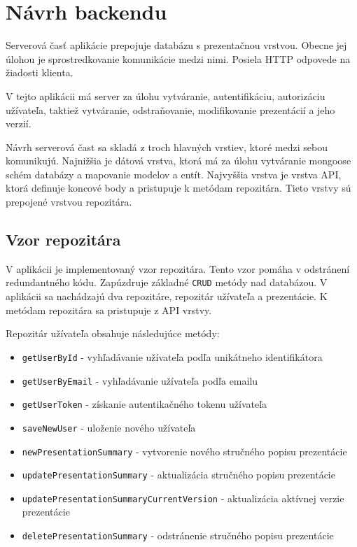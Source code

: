 \section{Návrh backendu}
Serverová časť aplikácie prepojuje databázu s prezentačnou vrstvou. Obecne jej úlohou je sprostredkovanie komunikácie medzi nimi. Posiela HTTP odpovede na žiadosti klienta.

V tejto aplikácii má server za úlohu vytváranie, autentifikáciu, autorizáciu užívateľa, taktiež vytváranie, odstraňovanie, modifikovanie prezentácií a jeho verzií.

Návrh serverová čast sa skladá z troch hlavných vrstiev, ktoré medzi sebou komunikujú. Najnižšia je dátová vrstva, ktorá má za úlohu vytváranie mongoose schém databázy a mapovanie modelov a entít. Najvyššia vrstva je vrstva API, ktorá definuje koncové body a pristupuje k metódam repozitára. Tieto vrstvy sú prepojené vrstvou repozitára.

\subsection*{Vzor repozitára}
\label{repository}
V aplikácii je implementovaný vzor repozitára. Tento vzor pomáha v odstránení redundantného kódu. Zapúzdruje základné \texttt{CRUD} metódy nad databázou. V aplikácii sa nachádzajú dva repozitáre, repozitár užívateľa a prezentácie. K metódam repozitára sa pristupuje z API vrstvy. 

\vspace{5mm}
\clearpage

Repozitár užívateľa obsahuje následujúce metódy:
    \begin{itemize}
        \item\texttt{getUserById} - vyhľadávanie užívateľa podľa unikátneho identifikátora
        \item\texttt{getUserByEmail} - vyhľadávanie užívateľa podľa emailu
        \item\texttt{getUserToken} - získanie autentikačného tokenu užívateľa
        \item\texttt{saveNewUser} - uloženie nového užívateľa
        \item\texttt{newPresentationSummary} - vytvorenie nového stručného popisu prezentácie
        \item\texttt{updatePresentationSummary} - aktualizácia stručného popisu prezentácie
        \item\texttt{updatePresentationSummaryCurrentVersion} - aktualizácia aktívnej verzie prezentácie
        \item\texttt{deletePresentationSummary} - odstránenie stručného popisu prezentácie
    \end{itemize}
    
